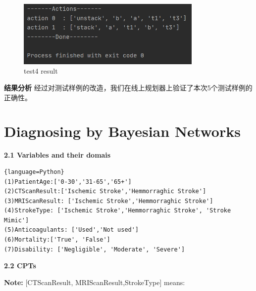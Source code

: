 \documentclass[a4paper, 11pt]{article}
\begin{document}
\begin{enumerate}
	\begin{figure}[H]
	\centering
	\includegraphics[width=0.8\textwidth]{Pic/test4.png}
	\caption{test4 result}
	\end{figure}
\end{enumerate}
\textbf{结果分析}\newline
经过对测试样例的改造，我们在线上规划器上验证了本次5个测试样例的正确性。

\section{Diagnosing by Bayesian Networks}
\textbf{2.1 Variables and their domais}
\begin{lstlisting}{language=Python}
(1)PatientAge:['0-30','31-65','65+']
(2)CTScanResult:['Ischemic Stroke','Hemmorraghic Stroke']
(3)MRIScanResult: ['Ischemic Stroke','Hemmorraghic Stroke']
(4)StrokeType: ['Ischemic Stroke','Hemmorraghic Stroke', 'Stroke Mimic']
(5)Anticoagulants: ['Used','Not used']
(6)Mortality:['True', 'False']
(7)Disability: ['Negligible', 'Moderate', 'Severe']
\end{lstlisting}
\textbf{2.2 CPTs}

\textbf{Note:} [CTScanResult, MRIScanResult,StrokeType] means:
\end{document}
